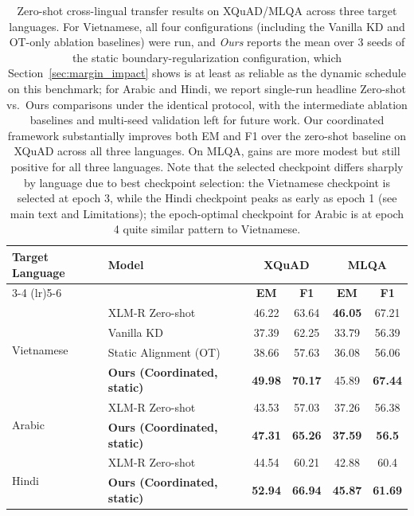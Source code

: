 \documentclass[11pt]{article}
\begin{document}
\begin{table}[t]
\centering
\begin{tabular}{llcccc}
\toprule
\multirow{2}{*}{\textbf{Target Language}} & \multirow{2}{*}{\textbf{Model}} & \multicolumn{2}{c}{\textbf{XQuAD}} & \multicolumn{2}{c}{\textbf{MLQA}} \\
\cmidrule(lr){3-4} \cmidrule(lr){5-6}
 & & \textbf{EM} & \textbf{F1} & \textbf{EM} & \textbf{F1} \\
\midrule
\multirow{4}{*}{Vietnamese}
 & XLM-R Zero-shot & 46.22 & 63.64 & \textbf{46.05} & 67.21 \\
 & Vanilla KD & 37.39 & 62.25 & 33.79 & 56.39 \\
 & Static Alignment (OT) & 38.66 & 57.63 & 36.08 & 56.06 \\
 & \textbf{Ours (Coordinated, static)} & \textbf{49.98} & \textbf{70.17} & 45.89 & \textbf{67.44} \\
\midrule
\multirow{2}{*}{Arabic}
 & XLM-R Zero-shot & 43.53 & 57.03 & 37.26 & 56.38 \\
 & \textbf{Ours (Coordinated, static)} & \textbf{47.31} & \textbf{65.26} & \textbf{37.59} & \textbf{56.5} \\
\midrule
\multirow{2}{*}{Hindi}
 & XLM-R Zero-shot & 44.54 & 60.21 & 42.88 & 60.4 \\
 & \textbf{Ours (Coordinated, static)} & \textbf{52.94} & \textbf{66.94} & \textbf{45.87} & \textbf{61.69} \\
\bottomrule
\end{tabular}
\caption{Zero-shot cross-lingual transfer results on XQuAD/MLQA across three target languages. For Vietnamese, all four configurations (including the Vanilla KD and OT-only ablation baselines) were run, and \emph{Ours} reports the mean over 3 seeds of the static boundary-regularization configuration, which Section~\ref{sec:margin_impact} shows is at least as reliable as the dynamic schedule on this benchmark; for Arabic and Hindi, we report single-run headline Zero-shot vs.\ Ours comparisons under the identical protocol, with the intermediate ablation baselines and multi-seed validation left for future work. Our coordinated framework substantially improves both EM and F1 over the zero-shot baseline on XQuAD across all three languages. On MLQA, gains are more modest but still positive for all three languages. Note that the selected checkpoint differs sharply by language due to best checkpoint selection: the Vietnamese checkpoint is selected at epoch 3, while the Hindi checkpoint peaks as early as epoch 1 (see main text and Limitations); the epoch-optimal checkpoint for Arabic is at epoch 4 quite similar pattern to Vietnamese.}
\label{tab:main_results}
\end{table}
\end{document}
